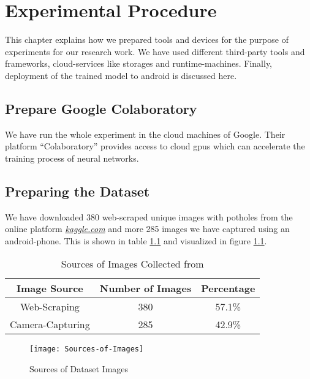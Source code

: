 \chapter{Experimental Procedure}
    This chapter explains how we prepared tools and devices for the purpose of experiments for our research work. We have used different third-party tools and frameworks, cloud-services like storages and runtime-machines. Finally, deployment of the trained model to android is discussed here.
        
    \section{Prepare Google Colaboratory}
        We have run the whole experiment in the cloud machines of Google. Their platform ``Colaboratory'' provides access to cloud \acrshort{gpu}s which can accelerate the training process of neural networks.
    
    \section{Preparing the Dataset}
        We have downloaded 380 web-scraped unique images with potholes from the online platform \href{https://kaggle.com}{\itshape{kaggle.com}} and more 285 images we have captured using an android-phone. This is shown in table \ref{tab:img_sources} and visualized in figure \ref{fig:image_sources}.
        
        \begin{table}[ht]
            \centering
            \begin{tabular}{|c|c|c|} \hline
                Image Source &  Number of Images & Percentage \\\hline\hline
                Web-Scraping & 380 & 57.1\% \\\hline
                Camera-Capturing & 285 & 42.9\% \\\hline
            \end{tabular}
            \caption{Sources of Images Collected from}
            \label{tab:img_sources}
        \end{table}
        
        \begin{figure}
            \centering
            \texttt{[image: Sources-of-Images]}
            \caption{Sources of Dataset Images}
            \label{fig:image_sources}
        \end{figure}
        
